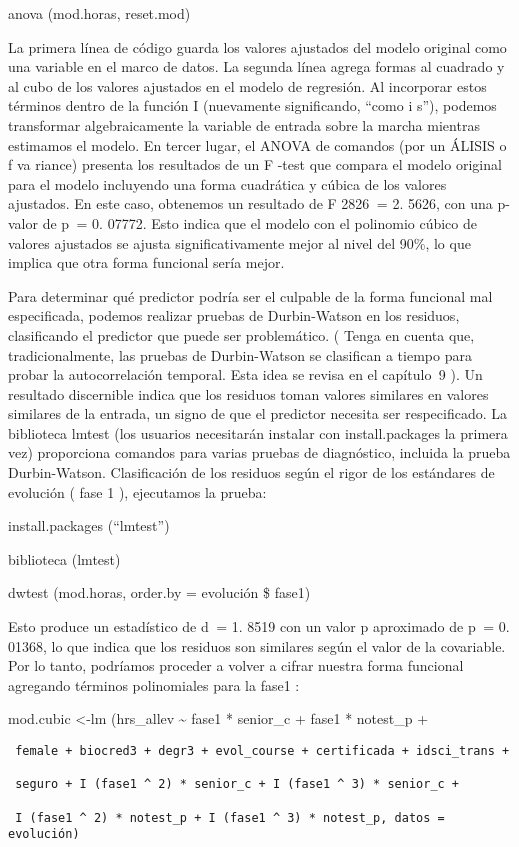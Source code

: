 \documentclass[
]{book}
\begin{document}
anova (mod.horas, reset.mod)

La primera línea de código guarda los valores ajustados del modelo original como una variable en el marco de datos. La segunda línea agrega formas al cuadrado y al cubo de los valores ajustados en el modelo de regresión. Al incorporar estos términos dentro de la función I (nuevamente significando, ``como i s''), podemos transformar algebraicamente la variable de entrada sobre la marcha mientras estimamos el modelo. En tercer lugar, el ANOVA de comandos (por un ÁLISIS o f va riance) presenta los resultados de un F -test que compara el modelo original para el modelo incluyendo una forma cuadrática y cúbica de los valores ajustados. En este caso, obtenemos un resultado de F 2826  = 2. 5626, con una p-valor de p  = 0. 07772. Esto indica que el modelo con el polinomio cúbico de valores ajustados se ajusta significativamente mejor al nivel del 90\%, lo que implica que otra forma funcional sería mejor.

Para determinar qué predictor podría ser el culpable de la forma funcional mal especificada, podemos realizar pruebas de Durbin-Watson en los residuos, clasificando el predictor que puede ser problemático. ( Tenga en cuenta que, tradicionalmente, las pruebas de Durbin-Watson se clasifican a tiempo para probar la autocorrelación temporal. Esta idea se revisa en el capítulo  9 ). Un resultado discernible indica que los residuos toman valores similares en valores similares de la entrada, un signo de que el predictor necesita ser respecificado. La biblioteca lmtest (los usuarios necesitarán instalar con install.packages la primera vez) proporciona comandos para varias pruebas de diagnóstico, incluida la prueba Durbin-Watson. Clasificación de los residuos según el rigor de los estándares de evolución ( fase 1 ), ejecutamos la prueba:

install.packages (``lmtest'')

biblioteca (lmtest)

dwtest (mod.horas, order.by = evolución \$ fase1)

Esto produce un estadístico de d  = 1. 8519 con un valor p aproximado de p  = 0. 01368, lo que indica que los residuos son similares según el valor de la covariable. Por lo tanto, podríamos proceder a volver a cifrar nuestra forma funcional agregando términos polinomiales para la fase1 :

mod.cubic \textless-lm (hrs\_allev \textasciitilde{} fase1 * senior\_c + fase1 * notest\_p +

\begin{verbatim}
 female + biocred3 + degr3 + evol_course + certificada + idsci_trans +

 seguro + I (fase1 ^ 2) * senior_c + I (fase1 ^ 3) * senior_c +

 I (fase1 ^ 2) * notest_p + I (fase1 ^ 3) * notest_p, datos = evolución)
\end{verbatim}
\end{document}
